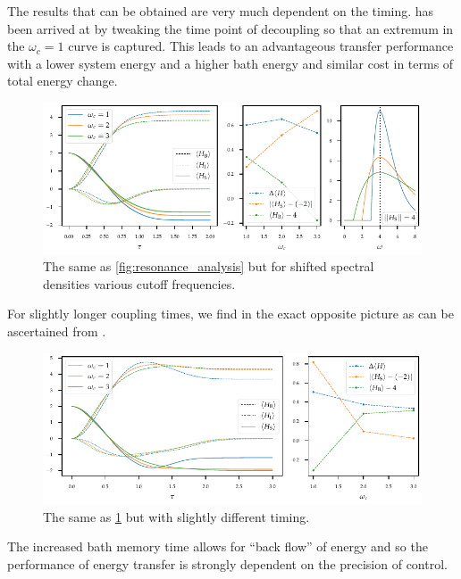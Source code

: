 The results that can be obtained are very much dependent on the
timing.  has been arrived at by tweaking the
time point of decoupling so that an extremum in the \(ω_{c}=1\) curve
is captured. This leads to an advantageous transfer performance with a
lower system energy and a higher bath energy and similar cost in terms
of total energy change.
\begin{figure}[h]
  \centering
  \includegraphics{figs/one_bath_syst/markov_analysis}
  \caption{\label{fig:markov_analysis} The same as
    \cref{fig:resonance_analysis} but for shifted spectral densities
    various cutoff frequencies.}
\end{figure}

For slightly longer coupling times, we find in
the exact opposite picture as can be ascertained from .
\begin{figure}[h]
  \centering
  \includegraphics{figs/one_bath_syst/markov_analysis_longer}
  \caption{\label{fig:markov_analysis_longer} The same as
    \cref{fig:markov_analysis} but with slightly different timing.}
\end{figure}
The increased bath memory time allows for ``back flow'' of energy and
so the performance of energy transfer is strongly dependent on the
precision of control.

